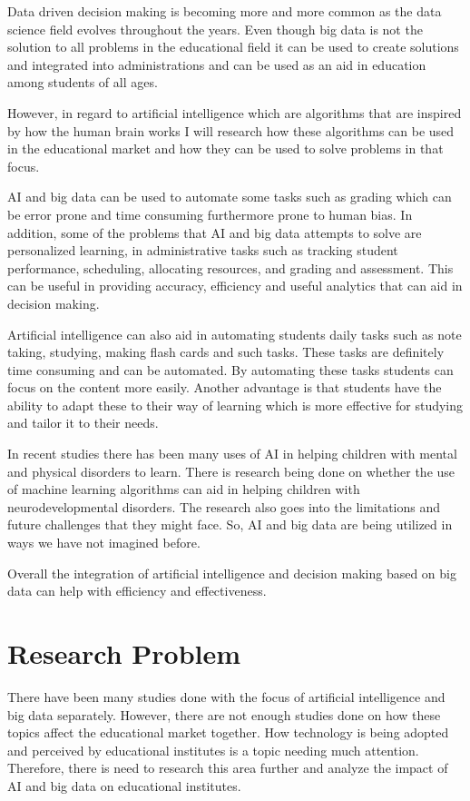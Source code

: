 \documentclass{imc-inf}
\begin{document}
Data driven decision making is becoming more and more common as the data science field evolves throughout the years. Even though big data is not the solution to all problems in the educational field it can be used to create solutions and integrated into administrations and can be used as an aid in education among students of all ages. 


However, in regard to artificial intelligence which are algorithms that are inspired by how the human brain works I will research how these algorithms can be used in the educational market and how they can be used to solve problems in that focus. 

AI and big data can be used to automate some tasks such as grading which can be error prone and time consuming furthermore prone to human bias. In addition, some of the problems that AI and big data attempts to solve are personalized learning, in administrative tasks such as tracking student performance, scheduling, allocating resources, and grading and assessment. This can be useful in providing accuracy, efficiency and useful analytics that can aid in decision making. 

Artificial intelligence can also aid in automating students daily tasks such as note taking, studying, making flash cards and such tasks. These tasks are definitely time consuming and can be automated. By automating these tasks students can focus on the content more easily. Another advantage is that students have the ability to adapt these to their way of learning which is more effective for studying and tailor it to their needs. 

In recent studies there has been many uses of AI in helping children with mental and physical disorders to learn. There is research being done on whether the use of machine learning algorithms can aid in helping children with neurodevelopmental disorders. The research also goes into the limitations and future challenges that they might face. So, AI and big data are being utilized in ways we have not imagined before. 

Overall the integration of artificial intelligence and decision making based on big data can help with efficiency and effectiveness. 

\section{Research Problem }
There have been many studies done with the focus of artificial intelligence and big data separately. However, there are not enough studies done on how these topics affect the educational market together. How technology is being adopted and perceived by educational institutes is a topic needing much attention. Therefore, there is need to research this area further and analyze the impact of AI and big data on educational institutes. 
\end{document}
